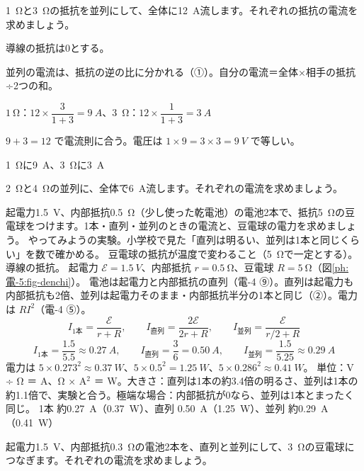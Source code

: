 \begin{reidai}[並列の電流の分かれ方]
\label{ph:電-5:ex2}\qty{1}{\ohm}と\qty{3}{\ohm}の抵抗を並列にして、全体に\qty{12}{A}流します。それぞれの抵抗の電流を求めましょう。
\par{} 導線の抵抗は0とする。
\par\kangaekata 並列の電流は、抵抗の逆の比に分かれる（①）。自分の電流＝全体×相手の抵抗÷2つの和。
\par\shiki $\qty{1}{\ohm}$：$12\times\dfrac{3}{1+3}=\qty{9}{A}$、\qty{3}{\ohm}：$12\times\dfrac{1}{1+3}=\qty{3}{A}$
\par{} $9+3=12$ で電流則に合う。電圧は $1\times9=3\times3=\qty{9}{V}$ で等しい。
\par\kotae \qty{1}{\ohm}に\qty{9}{A}、\qty{3}{\ohm}に\qty{3}{A}
\end{reidai}
\begin{jibun}
\qty{2}{\ohm}と\qty{4}{\ohm}の並列に、全体で\qty{6}{A}流します。それぞれの電流を求めましょう。
\end{jibun}

\begin{phreidai}
\label{ph:電-5:ex3}起電力\qty{1.5}{V}、内部抵抗\qty{0.5}{\ohm}（少し使った乾電池）の電池2本で、抵抗\qty{5}{\ohm}の豆電球をつけます。1本・直列・並列のときの電流と、豆電球の電力を求めましょう。
\phbamen
やってみようの実験。小学校で見た「直列は明るい、並列は1本と同じくらい」を数で確かめる。
\phmushi
豆電球の抵抗が温度で変わること（\qty{5}{\ohm}で一定とする）。導線の抵抗。
\phzu
起電力 $\mathcal E=\qty{1.5}{V}$、内部抵抗 $r=\qty{0.5}{\ohm}$、豆電球 $R=\qty{5}{\ohm}$（図\ref{ph:電-5:fig-denchi}）。
\phriyu
電池は起電力と内部抵抗の直列（電-4 ⑨）。直列は起電力も内部抵抗も2倍、並列は起電力そのまま・内部抵抗半分の1本と同じ（②）。電力は $RI^2$（電-4 ⑤）。
\phtateru
\[ I_{1\text{本}}=\frac{\mathcal E}{r+R},\qquad I_{\text{直列}}=\frac{2\mathcal E}{2r+R},\qquad I_{\text{並列}}=\frac{\mathcal E}{r/2+R} \]
\phtoku
\[ I_{1\text{本}}=\frac{1.5}{5.5}\approx\qty{0.27}{A},\qquad I_{\text{直列}}=\frac{3}{6}=\qty{0.50}{A},\qquad I_{\text{並列}}=\frac{1.5}{5.25}\approx\qty{0.29}{A} \]
電力は $5\times0.273^2\approx\qty{0.37}{W}$、$5\times0.5^2=\qty{1.25}{W}$、$5\times0.286^2\approx\qty{0.41}{W}$。
\phtashikame
単位：V ÷ Ω ＝ A、Ω × A$^2$ ＝ W。大きさ：直列は1本の約3.4倍の明るさ、並列は1本の約1.1倍で、実験と合う。極端な場合：内部抵抗が0なら、並列は1本とまったく同じ。
\kotae 1本 約\qty{0.27}{A}（\qty{0.37}{W}）、直列 \qty{0.50}{A}（\qty{1.25}{W}）、並列 約\qty{0.29}{A}（\qty{0.41}{W}）
\end{phreidai}
\begin{jibun}
起電力\qty{1.5}{V}、内部抵抗\qty{0.3}{\ohm}の電池2本を、直列と並列にして、\qty{3}{\ohm}の豆電球につなぎます。それぞれの電流を求めましょう。
\end{jibun}

